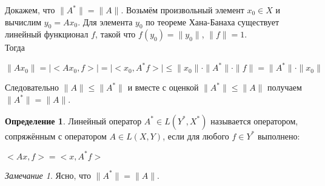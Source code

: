 \documentclass[12pt,a4paper,titlepage, oneside]{book}
\theoremstyle{definition}
\newtheorem*{definition}{Определение}
\theoremstyle{plain}
\theoremstyle{remark}
\newtheorem*{remark}{Замечание}
\theoremstyle{remark}
\theoremstyle{remark}
\theoremstyle{remark}
\theoremstyle{plain}
\theoremstyle{plain}
\begin{document}
Докажем, что $\lVert A^* \lVert = 
\lVert A \lVert$. Возьмём произвольный элемент $x_0 \in X$ и вычислим $y_0=Ax_0$. Для элемента $y_0$ по теореме Хана-Банаха существует линейный функционал $f$, такой что
$f(y_0)= \lVert y_0 \lVert$, $\lVert f \lVert =1$.\\
Тогда
\begin{center}
$\lVert Ax_0 \lVert = \vert <Ax_0,f> \vert =
\vert <x_0,A^*f> \vert \leq 
\lVert x_0 \lVert \cdot \lVert A^* \lVert
\cdot \lVert f \lVert = \lVert A^* \lVert
\cdot \lVert x_0 \lVert$
\end{center}
Следовательно $\lVert A \lVert \leq
\lVert A^* \lVert$ и вместе с оценкой $\lVert A^* \lVert \leq 
\lVert A \lVert$ получаем $\lVert A^* \lVert = 
\lVert A \lVert$.
\begin{definition}
Линейный оператор $A^* \in L(Y^*,X^*)$ называется оператором, сопряжённым с оператором $A \in L(X,Y)$, если для любого $f \in Y^*$ выполнено:
\begin{center}
$<Ax,f> = <x,A^*f>$
\end{center}
\end{definition}
\begin{remark}
Ясно, что $\lVert A^* \lVert = 
\lVert A \lVert$.
\end{remark}
\end{document}
